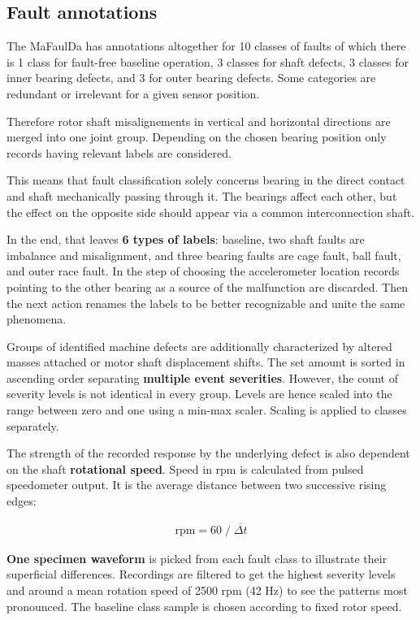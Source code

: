 \subsection{Fault annotations}
The MaFaulDa has annotations altogether for 10 classes of faults of which there is 1 class for fault-free baseline operation, 3 classes for shaft defects, 3 classes for inner bearing defects, and 3 for outer bearing defects. Some categories are redundant or irrelevant for a given sensor position. 

Therefore rotor shaft misalignements in vertical and horizontal directions are merged into one joint group. Depending on the chosen bearing position only records having relevant labels are considered. 

This means that fault classification solely concerns bearing in the direct contact and shaft mechanically passing through it. The bearings affect each other, but the effect on the opposite side should appear via a common interconnection shaft. 

In the end, that leaves \textbf{6 types of labels}: baseline, two shaft faults are imbalance and misalignment, and three bearing faults are cage fault, ball fault, and outer race fault. In the step of choosing the accelerometer location records pointing to the other bearing as a source of the malfunction are discarded. Then the next action renames the labels to be better recognizable and unite the same phenomena.

Groups of identified machine defects are additionally characterized by altered masses attached or motor shaft displacement shifts. The set amount is sorted in ascending order separating \textbf{multiple event severities}. However, the count of severity levels is not identical in every group. Levels are hence scaled into the range between zero and one using a min-max scaler. Scaling is applied to classes separately.

The strength of the recorded response by the underlying defect is also dependent on the shaft \textbf{rotational speed}. Speed in rpm is calculated from pulsed speedometer output. It is the average distance between two successive rising edges: 
\begin{ceqn}\begin{align}
\mathrm{rpm} = 60 \;/\; \overline{\Delta t}
\end{align}\end{ceqn}

\textbf{One specimen waveform} is picked from each fault class to illustrate their superficial differences. Recordings are filtered to get the highest severity levels and around a mean rotation speed of 2500 rpm (42 Hz)  to see the patterns most pronounced. The baseline class sample is chosen according to fixed rotor speed.


